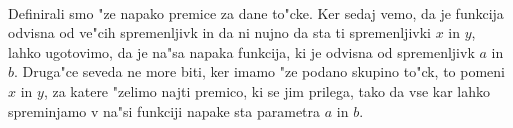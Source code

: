 \paragraph{}
Definirali smo "ze napako premice za dane to"cke. Ker sedaj vemo, da je funkcija odvisna od ve"cih spremenljivk in da ni nujno da sta ti spremenljivki $x$ in $y$, lahko ugotovimo, da je na"sa napaka funkcija, ki je odvisna od spremenljivk $a$ in $b$. Druga"ce seveda ne more biti, ker imamo "ze podano skupino to"ck, to pomeni $x$ in $y$, za katere "zelimo najti premico, ki se jim prilega, tako da vse kar lahko spreminjamo v na"si funkciji napake sta parametra $a$ in $b$.